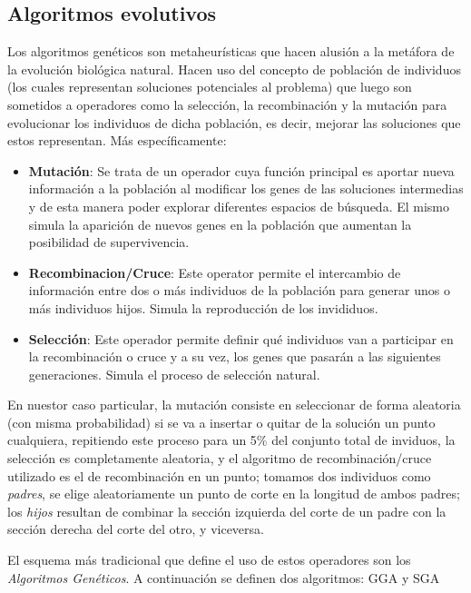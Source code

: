 \documentclass{ci5652}
\begin{document}
\subsection{Algoritmos evolutivos}
Los algoritmos genéticos son metaheurísticas que hacen alusión a la metáfora de la evolución biológica natural. Hacen uso del concepto de población de individuos (los cuales representan soluciones potenciales al problema) que luego son sometidos a operadores como la selección, la recombinación y la mutación para evolucionar los individuos de dicha población, es decir, mejorar las soluciones que estos representan. Más específicamente:

\begin{itemize}
\item \textbf{Mutación}: Se trata de un operador cuya función principal es aportar nueva información a la población al modificar los genes de las soluciones intermedias y de esta manera poder explorar diferentes espacios de búsqueda. El mismo simula la aparición de nuevos genes en la población que aumentan la posibilidad de supervivencia.

\item \textbf{Recombinacion/Cruce}: Este operator permite el intercambio de información entre dos o más individuos de la población para generar unos o más individuos hijos. Simula la reproducción de los invididuos.

\item \textbf{Selección}: Este operador permite definir qué individuos van a participar en la recombinación o cruce y a su vez, los genes que pasarán a las siguientes generaciones. Simula el proceso de selección natural.
\end{itemize}

En nuestor caso particular, la mutación consiste en seleccionar de forma aleatoria (con misma probabilidad) si se va a insertar o quitar de la solución un punto cualquiera, repitiendo este proceso para un 5\% del conjunto total de inviduos, la selección es completamente aleatoria, y el algoritmo de recombinación/cruce utilizado es el de recombinación en un punto; tomamos dos individuos como \textit{padres}, se elige aleatoriamente un punto de corte en la longitud de ambos padres; los \textit{hijos} resultan de combinar la sección izquierda del corte de un padre con la sección derecha del corte del otro, y viceversa.

El esquema más tradicional que define el uso de estos operadores son los \textit{Algoritmos Genéticos}. A continuación se definen dos algoritmos: GGA y SGA
\end{document}
